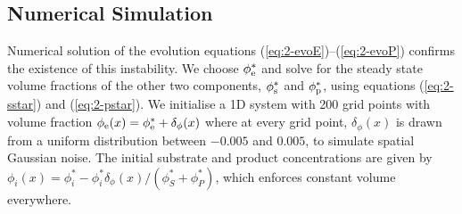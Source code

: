 \subsection{Numerical Simulation}

Numerical solution of the evolution equations (\ref{eq:2-evoE})--(\ref{eq:2-evoP}) confirms the existence of this instability. We choose $\phi_{\mathrm{e}}^*$ and solve for the steady state volume fractions of the other two components, $\phi_{\mathrm{s}}^*$ and $\phi_{\mathrm{p}}^*$, using equations (\ref{eq:2-sstar}) and (\ref{eq:2-pstar}). We initialise a 1D system with 200 grid points with volume fraction $\phi_{\mathrm{e}}(x) = \phi_{\mathrm{e}}^* + \delta_{\phi}(x)$ where at every grid point, $\delta_{\phi}(x)$ is drawn from a uniform distribution between $-0.005$ and $0.005$, to simulate spatial Gaussian noise. The initial substrate and product concentrations are given by $\phi_i(x) = \phi_i^* - \phi_i^*\delta_{\phi}(x)/(\phi_S^*+\phi_P^*)$, which enforces constant volume everywhere.

